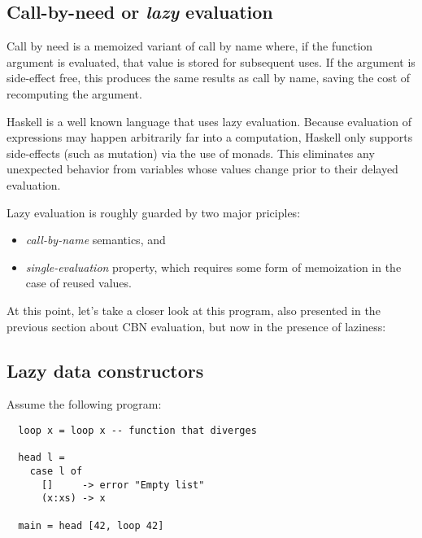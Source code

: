 \documentclass[diploma]{softlab-thesis}
\begin{document}
\subsection {Call-by-need or \textit{lazy} evaluation}
\label{sec:lazy}

Call by need is a memoized variant of call by name where, if the function argument is evaluated, 
that value is stored for subsequent uses. If the argument is side-effect free, this produces the same results as call by name, 
saving the cost of recomputing the argument. 

Haskell is a well known language that uses lazy evaluation. Because evaluation of expressions may happen arbitrarily 
far into a computation, Haskell only supports side-effects (such as mutation) via the use of monads. This eliminates any 
unexpected behavior from variables whose values change prior to their delayed evaluation.

Lazy evaluation is roughly guarded by two major priciples:
\begin{itemize}
  \item \textit{call-by-name} semantics, and
  \item \textit{single-evaluation} property, which requires some form of memoization in the case of reused values.
\end{itemize}

At this point, let's take a closer look at this program, also presented in the previous section about CBN evaluation,
but now in the presence of laziness:

\subsection{Lazy data constructors}
\label{sec:lazy-data-cons}

Assume the following program:

\begin{verbatim}
  loop x = loop x -- function that diverges

  head l = 
    case l of 
      []     -> error "Empty list"
      (x:xs) -> x

  main = head [42, loop 42]
\end{verbatim}
\end{document}
